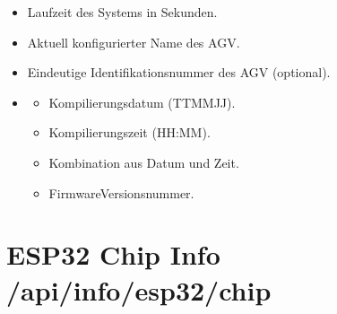 \documentclass[letterpaper,10pt,english]{sphinxmanual}
\begin{document}
\sphinxAtStartPar
{}
\begin{itemize}
\item {} 
\sphinxAtStartPar
{}  \textendash{} Laufzeit des Systems in Sekunden.

\item {} 
\sphinxAtStartPar
{}  \textendash{} Aktuell konfigurierter Name des AGV.

\item {} 
\sphinxAtStartPar
{}  \textendash{} Eindeutige Identifikationsnummer des AGV (optional).

\item {} \begin{description}
\begin{itemize}
\item {} 
\sphinxAtStartPar
{}  \textendash{} Kompilierungsdatum (TT\sphinxhyphen{}MM\sphinxhyphen{}JJ).

\item {} 
\sphinxAtStartPar
{}  \textendash{} Kompilierungszeit (HH:MM).

\item {} 
\sphinxAtStartPar
{}  \textendash{} Kombination aus Datum und Zeit.

\item {} 
\sphinxAtStartPar
{}  \textendash{} Firmware\sphinxhyphen{}Versionsnummer.

\end{itemize}

\end{description}

\end{itemize}


\section{ESP32 Chip Info \textendash{} /api/info/esp32/chip}
\label{\detokenize{agv_rest_api_info:esp32-chip-info-api-info-esp32-chip}}\label{\detokenize{agv_rest_api_info:get-api-info-esp32-chip}}
\end{document}
